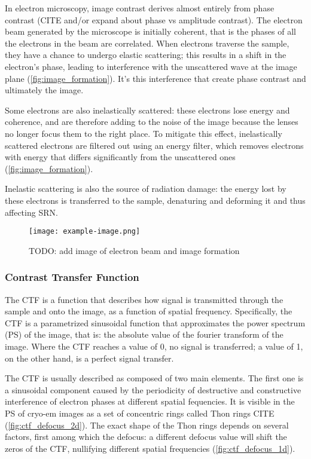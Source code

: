 In electron microscopy, image contrast derives almost entirely from phase contrast (CITE and/or expand about phase vs amplitude contrast).
The electron beam generated by the microscope is initially coherent, that is the phases of all the electrons in the beam are correlated.
When electrons traverse the sample, they have a chance to undergo elastic scattering; this results in a shift in the electron's phase, leading to interference with the unscattered wave at the image plane (\autoref{fig:image_formation}).
It's this interference that create phase contrast and ultimately the image.

Some electrons are also inelastically scattered: these electrons lose energy and coherence, and are therefore adding to the noise of the image because the lenses no longer focus them to the right place.
To mitigate this effect, inelastically scattered electrons are filtered out using an energy filter, which removes electrons with energy that differs significantly from the unscattered ones (\autoref{fig:image_formation}).

Inelastic scattering is also the source of radiation damage: the energy lost by these electrons is transferred to the sample, denaturing and deforming it and thus affecting SRN.

\begin{figure}[ht]
    \centering
    \texttt{[image: example-image.png]}
    \caption[Image formation in cryo-EM]{TODO: add image of electron beam and image formation}
    \label{fig:image_formation}
\end{figure}

\subsubsection{Contrast Transfer Function}

The CTF is a function that describes how signal is transmitted through the sample and onto the image, as a function of spatial frequency.
Specifically, the CTF is a parametrized sinusoidal function that approximates the power spectrum (PS) of the image, that is: the absolute value of the fourier transform of the image.
Where the CTF reaches a value of \num{0}, no signal is transferred; a value of \num{1}, on the other hand, is a perfect signal transfer.

The CTF is usually described as composed of two main elements.
The first one is a sinusoidal component caused by the periodicity of destructive and constructive interference of electron phases at different spatial fequencies.
It is visible in the PS of cryo-em images as a set of concentric rings called Thon rings CITE (\autoref{fig:ctf_defocus_2d}).
The exact shape of the Thon rings depends on several factors, first among which the defocus: a different defocus value will shift the zeros of the CTF, nullifying different spatial frequencies (\autoref{fig:ctf_defocus_1d}).

